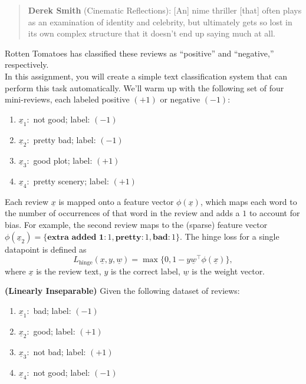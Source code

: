 \documentclass{article}
\theoremstyle{definition}
\begin{document}
\begin{question}
\begin{quote}
		\textbf{Derek Smith} (Cinematic Reflections): [An] nime thriller [that] often plays as an examination of identity and celebrity, but ultimately gets so lost in its own complex structure that it doesn't end up saying much at all.
	\end{quote}
	
	Rotten Tomatoes has classified these reviews as ``positive'' and ``negative,'' respectively.\\
	
	In this assignment, you will create a simple text classification system that can perform this task automatically. We'll warm up with the following set of four mini-reviews, each labeled positive $(+1)$ or negative $(-1)$:
	\begin{enumerate}
		\item $\underline{x}_1:$ not good; label: $(-1)$
		\item $\underline{x}_2:$ pretty bad; label: $(-1)$
		\item $\underline{x}_3:$ good plot; label: $(+1)$
		\item $\underline{x}_4:$ pretty scenery; label: $(+1)$
	\end{enumerate}
	
	Each review $\underline{x}$ is mapped onto a feature vector $\phi(\underline{x})$, which maps each word to the number of occurrences of that word in the review and adds a $1$ to account for bias. For example, the second review maps to the (sparse) feature vector $\phi(\underline{x}_2)=\{\textbf{extra added 1}:1, \textbf{pretty}:1,\textbf{bad}:1\}$. The hinge loss for a single datapoint is defined as
	\begin{equation*}
		L_{\text{hinge}}(\underline{x}, y,\underline{w})= \max\{0, 1-y\underline{w}^\top\phi(\underline{x})\},
	\end{equation*}
	where $\underline{x}$ is the review text, $y$ is the correct label, $\underline{w}$ is the weight vector.
	\begin{question}
		\item \textbf{(Linearly Inseparable)} Given the following dataset of reviews:
		\begin{enumerate}
			\item $\underline{x}_1:$ bad; label: $(-1)$
			\item $\underline{x}_2:$ good; label: $(+1)$
			\item $\underline{x}_3:$ not bad; label: $(+1)$
			\item $\underline{x}_4:$ not good; label: $(-1)$
		\end{enumerate}
		

\end{question}
\end{question}
\end{document}
